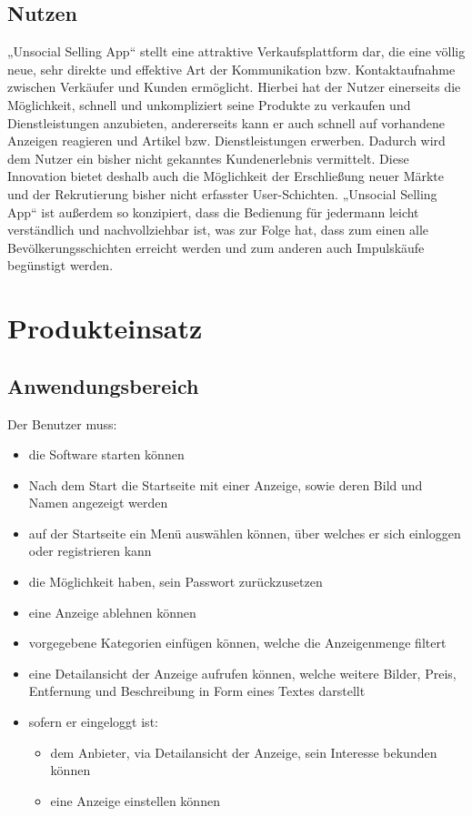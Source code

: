 \documentclass[a4paper,12pt,oneside]{scrartcl}
\begin{document}
\subsection{Nutzen}
„Unsocial Selling App“ stellt eine attraktive Verkaufsplattform dar, die eine völlig neue, sehr direkte und effektive Art der Kommunikation bzw. Kontaktaufnahme zwischen Verkäufer und Kunden ermöglicht.
Hierbei hat der Nutzer einerseits die Möglichkeit, schnell und unkompliziert seine Produkte zu verkaufen und Dienstleistungen anzubieten, andererseits kann er auch schnell auf vorhandene Anzeigen reagieren und Artikel bzw. Dienstleistungen erwerben.
Dadurch wird dem Nutzer ein bisher nicht gekanntes Kundenerlebnis vermittelt.
Diese Innovation bietet deshalb auch die Möglichkeit der Erschließung neuer Märkte und der Rekrutierung bisher nicht erfasster User-Schichten.
„Unsocial Selling App“ ist außerdem so konzipiert, dass die Bedienung für jedermann leicht verständlich und nachvollziehbar ist, was zur Folge hat, dass zum einen alle Bevölkerungsschichten erreicht werden und zum anderen auch Impulskäufe begünstigt werden. 





\section{Produkteinsatz}
\subsection{Anwendungsbereich}
Der Benutzer muss:
\begin{itemize}
	\item die Software starten können 
	\item Nach dem Start die Startseite mit einer Anzeige, sowie deren Bild und Namen angezeigt werden 
	\item auf der Startseite ein Menü auswählen können, über welches er sich einloggen oder registrieren kann 
	\item die Möglichkeit haben, sein Passwort zurückzusetzen 
	\item eine Anzeige ablehnen können 
	\item vorgegebene Kategorien einfügen können, welche die Anzeigenmenge filtert 
	\item eine Detailansicht der Anzeige aufrufen können, welche weitere Bilder, Preis, Entfernung und Beschreibung in Form eines Textes darstellt 

	\item sofern er eingeloggt ist: 
	\begin{itemize}
		\item dem Anbieter, via Detailansicht der Anzeige, sein Interesse bekunden können
		\item eine Anzeige einstellen können	
	\end{itemize}
\end{itemize}
\end{document}
